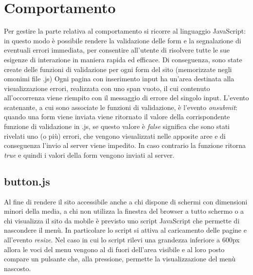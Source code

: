 \documentclass[../Relazione.tex]{subfiles}
\begin{document}
\section{Comportamento}

Per gestire la parte relativa al comportamento si ricorre al linguaggio JavaScript: in questo modo è possibile rendere la validazione delle form e la segnalazione di eventuali errori immediata, per consentire all'utente di risolvere tutte le sue esigenze di interazione in maniera rapida ed efficace. Di conseguenza, sono state create delle funzioni di validazione per ogni form del sito (memorizzate negli omonimi file .js)  Ogni pagina con inserimento input ha un'area destinata alla visualizzazione errori, realizzata con uno span vuoto, il cui contenuto all'occorrenza viene riempito con il messaggio di errore del singolo input. L'evento scatenante, a cui sono associate le funzioni di validazione, è l'evento \textit{onsubmit}: quando una form viene inviata viene ritornato il valore della corrispondente funzione di validazione in .js, se questo valore è \textit{false} significa che sono stati rivelati uno (o più) errori, che vengono visualizzati nelle apposite aree e di conseguenza l'invio al server viene impedito. In caso contrario la funzione ritorna \textit{true} e quindi i valori della form vengono inviati al server.

\subsection{button.js}

Al fine di rendere il sito accessibile anche a chi dispone di schermi con dimensioni minori della media, a chi non utilizza la finestra del browser a tutto schermo o a chi visualizza il sito da mobile è previsto uno script JavaScript che permette di nascondere il menù. In particolare lo script si attiva al caricamento delle pagine e all'evento \textit{resize}. Nel caso in cui lo script rilevi una grandezza inferiore a 600px allora le voci del menu vengono al di fuori dell'area visibile e al loro posto compare un pulsante che, alla pressione, permette la visualizzazione del menù nascosto.

			
\end{document}
